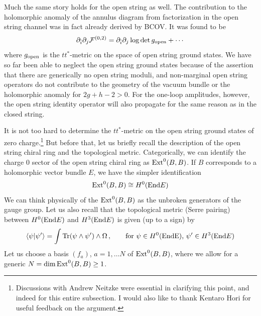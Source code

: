 Much the same story holds for the open string as well. The contribution
to the holomorphic anomaly of the annulus diagram from factorization
in the open string channel was in fact already derived by BCOV. It
was found to be
\begin{equation}
\eqlabel{incomplete}
\del_\ib\del_j \F 02 = \del_\ib\del_j \log\det g_{\rm open} + \cdots
\end{equation}
where $g_{\rm open}$ is the $tt^*$-metric on the space of open string
ground states. We have so far been able to neglect the open string
ground states because of the assertion that there are generically
no open string moduli, and non-marginal open string operators do 
not contribute to the geometry of the vacuum bundle or the holomorphic
anomaly for $2g+h-2>0$. For the one-loop amplitudes, however, the open 
string identity operator will also propagate for the same reason as 
in the closed string. 

It is not too hard to determine the $tt^*$-metric on the open string 
ground states of zero charge.\footnote{Discussions with Andrew Neitzke
were essential in clarifying this point, and indeed for this 
entire subsection. I would also like to thank Kentaro Hori for useful 
feedback on the argument.} But before that, let us briefly recall
the description of the open string chiral ring and the topological
metric. Categorically, we can identify the charge $0$ sector of the
open string chiral ring as ${\rm Ext}^0(B,B)$. If $B$ corresponds
to a holomorphic vector bundle $E$, we have the simpler identification
\begin{equation}
\eqlabel{opencc}
{\rm Ext}^0(B,B)\cong H^0({\rm End}E)
\end{equation}
We can think physically of the ${\rm Ext}^0(B,B)$ as the unbroken
generators of the gauge group. Let us also recall that the 
topological metric (Serre pairing) between $H^0({\rm End}E)$
and $H^3({\rm End}E)$ is given (up to a sign) by
\begin{equation}
\langle \psi | \psi' \rangle = \int {\rm Tr} (\psi\wedge\psi')\wedge\Omega
\,,\qquad \text{for $\psi\in H^0({\rm End E})$, $\psi'\in H^3({\rm End}E)$}
\end{equation}
Let us choose a basis $(f_a)$, $a=1,\ldots N$ of ${\rm Ext}^0(B,B)$,
where we allow for a generic $N=\dim{\rm Ext}^0(B,B)\ge 1$.

